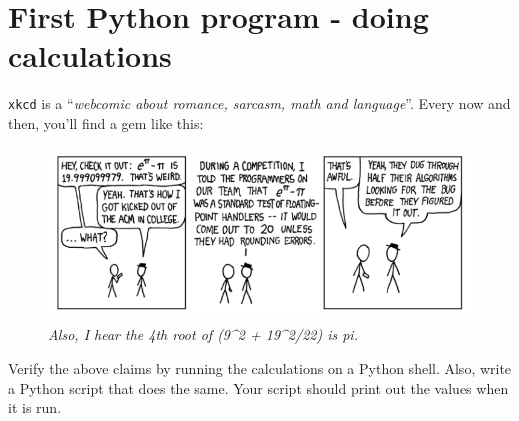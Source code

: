 \documentclass{article}
\begin{document}
\section*{First Python program - doing calculations}
\texttt{xkcd} is a ``\emph{webcomic about romance, sarcasm, math and language}''. 
Every now and then, you'll find a gem like this: \newline
\begin{figure}[h]
\begin{center}
\includegraphics[height=130pt]{../pictures/xkcd_pi.png}
\emph{Also, I hear the 4th root of (9\^{}2 + 19\^{}2/22) is pi.}
\end{center}
\end{figure}

Verify the above claims by running the calculations on a Python shell. Also, write a 
Python script that does the same. Your script should print out the values when it is
run.
\end{document}
